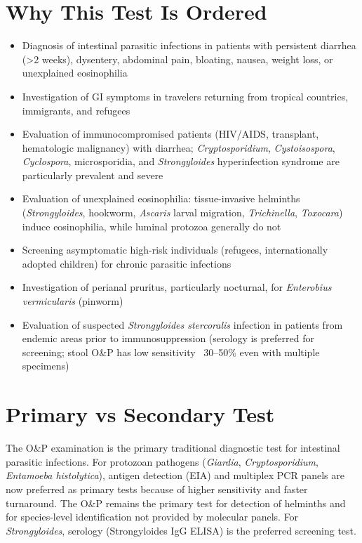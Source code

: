 \section*{Why This Test Is Ordered}
\begin{itemize}
  \item Diagnosis of intestinal parasitic infections in patients with persistent diarrhea (>2 weeks), dysentery, abdominal pain, bloating, nausea, weight loss, or unexplained eosinophilia
  \item Investigation of GI symptoms in travelers returning from tropical countries, immigrants, and refugees
  \item Evaluation of immunocompromised patients (HIV/AIDS, transplant, hematologic malignancy) with diarrhea; \textit{Cryptosporidium}, \textit{Cystoisospora}, \textit{Cyclospora}, microsporidia, and \textit{Strongyloides} hyperinfection syndrome are particularly prevalent and severe
  \item Evaluation of unexplained eosinophilia: tissue-invasive helminths (\textit{Strongyloides}, hookworm, \textit{Ascaris} larval migration, \textit{Trichinella}, \textit{Toxocara}) induce eosinophilia, while luminal protozoa generally do not
  \item Screening asymptomatic high-risk individuals (refugees, internationally adopted children) for chronic parasitic infections
  \item Investigation of perianal pruritus, particularly nocturnal, for \textit{Enterobius vermicularis} (pinworm)
  \item Evaluation of suspected \textit{Strongyloides stercoralis} infection in patients from endemic areas prior to immunosuppression (serology is preferred for screening; stool O\&P has low sensitivity ~30--50\% even with multiple specimens)
\end{itemize}

\section*{Primary vs Secondary Test}
The O\&P examination is the primary traditional diagnostic test for intestinal parasitic infections. For protozoan pathogens (\textit{Giardia}, \textit{Cryptosporidium}, \textit{Entamoeba histolytica}), antigen detection (EIA) and multiplex PCR panels are now preferred as primary tests because of higher sensitivity and faster turnaround. The O\&P remains the primary test for detection of helminths and for species-level identification not provided by molecular panels. For \textit{Strongyloides}, serology (Strongyloides IgG ELISA) is the preferred screening test.

